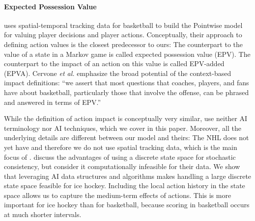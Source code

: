 \documentclass[]{article}
\begin{document}
\paragraph{Expected Possession Value}
\citep{Cervone2014a} uses spatial-temporal tracking data for basketball to build the {\sc Pointwise} model for valuing player decisions and player actions. Conceptually, their approach to defining action values is the closest predecessor to ours: The counterpart to the value of a state in a Markov game is called expected possession value (EPV). The counterpart to the impact of an action on this value is called EPV-added (EPVA). Cervone {\em et al.} emphasize the broad potential of the context-based impact definitions: ``we assert that most questions that coaches, players, and fans have about basketball, particularly those that involve the offense, can be phrased and answered in terms of EPV.''

While the definition of action impact is conceptually very similar, \citeauthor{Cervone2014a} use neither AI terminology nor AI techniques, which we cover in this paper. Moreover, all the underlying details are different between our model and theirs: The NHL does not yet have and therefore we do not use spatial tracking data, which is the main focus of \citeauthor{Cervone2014a}.
\citeauthor{Cervone2014a} discuss the advantages of using a discrete state space for stochastic consistency, but consider it computationally infeasible for their data.
We show that leveraging AI data structures and algorithms makes handling a large discrete state space feasible for ice hockey.
Including the local action history in the state space allows us to capture the medium-term effects of actions.
This is more important for ice hockey than for basketball, because scoring in basketball occurs at much shorter intervals.

\end{document}
